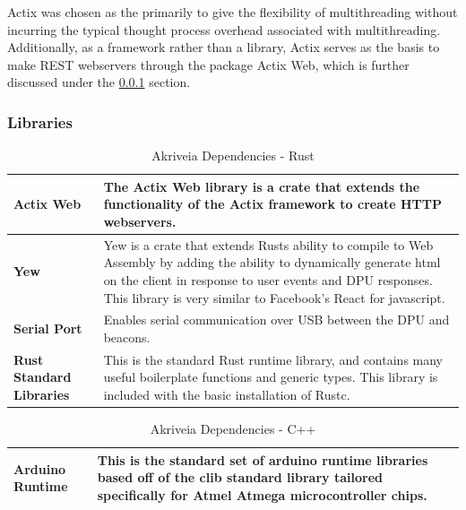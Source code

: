 \bigskip
Actix was chosen as the primarily to give the flexibility of multithreading without incurring the typical thought process overhead associated with multithreading. Additionally, as a framework rather than a library, Actix serves as the basis to make REST webservers through the package Actix Web, which is further discussed under the \ref{software_libraries} section.

\subsubsection{Libraries}
\label{software_libraries}

\begin{table}[H]
\centering
\begin{tabular}{ | m{3.25cm} | m{12.5cm} |}
	\hline
	\textbf{Actix Web} & The Actix Web library is a crate that extends the functionality of the Actix framework to create HTTP webservers. \\
	\hline
	\textbf{Yew} & Yew is a crate that extends Rusts ability to compile to Web Assembly by adding the ability to dynamically generate html on the client in response to user events and DPU responses. This library is very similar to Facebook's React for javascript. \\
	\hline
	\textbf{Serial Port} & Enables serial communication over USB between the DPU and beacons.\\
	\hline
	\textbf{Rust Standard Libraries} & This is the standard Rust runtime library, and contains many useful boilerplate functions and generic types. This library is included with the basic installation of Rustc. \\
	\hline
\end{tabular}
\caption{Akriveia Dependencies - Rust}
\end{table}

\begin{table}[H]
\centering
\begin{tabular}{ | m{3.25cm} | m{12.5cm} |}
	\hline
	\textbf{Arduino Runtime} & This is the standard set of arduino runtime libraries based off of the clib standard library tailored specifically for Atmel Atmega microcontroller chips. \\
	\hline
\end{tabular}
\caption{Akriveia Dependencies - C++}
\end{table}

\bigskip
